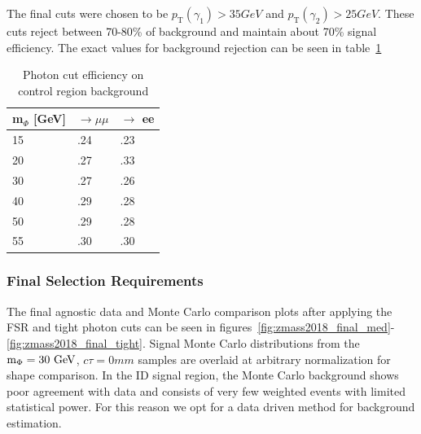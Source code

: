 The final cuts were chosen to be $p_\mathrm{T}(\gamma_1)>35\unit{GeV}$ and $p_\mathrm{T}(\gamma_2)>25\unit{GeV}$. These cuts reject between 70-80\% of background and maintain about 70\% signal efficiency. The exact values for background rejection can be seen in table~\ref{tab:cuts_pt}

\begin{table}[htb!]
	\begin{center}
		\caption[Photon \pt cut efficiency on control region background]{Photon \pt cut efficiency on control region background}
		\label{tab:cuts_pt}
		\begin{tabular}{l|l|l}
			\hline
			m$_{\Phi}$ [GeV] & \VZ $\rightarrow \mu \mu$  & \VZ $\rightarrow$ ee\\
			\hline
			15	&	.24	&	.23 \\	
			\hline
			20	&	.27	&	.33 \\
			\hline
			30	&	.27	&	.26 \\
			\hline
			40	&	.29	&	.28 \\
			\hline
			50	&	.29	&	.28 \\
			\hline
			55	&	.30	&	.30 \\
			\hline
		\end{tabular}
	\end{center}
\end{table}

\subsubsection{Final Selection Requirements} \label{sec:ana_final_selection}
The final \lxy agnostic data and Monte Carlo comparison plots after applying the FSR and tight photon \pt cuts can be seen in figures~\ref{fig:zmass2018_final_med}-\ref{fig:zmass2018_final_tight}. Signal Monte Carlo distributions from the $\mphi=30\unit{GeV}$, $c\tau=0\unit{mm}$ samples are overlaid at arbitrary normalization for shape comparison. In the ID signal region, the Monte Carlo background shows poor agreement with data and consists of very few weighted events with limited statistical power. For this reason we opt for a data driven method for background estimation.

